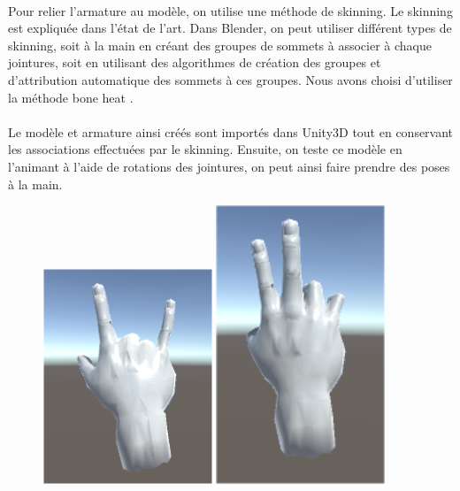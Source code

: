 \paragraph{}
Pour relier l'armature au modèle, on utilise une méthode de skinning. Le skinning est expliquée dans l'état de l'art. Dans Blender, on peut utiliser différent types de skinning, soit \og à la main \fg en créant des groupes de sommets à associer à chaque jointures, soit en utilisant des algorithmes de création des groupes et d'attribution automatique des sommets à ces groupes. Nous avons choisi d'utiliser la méthode \og bone heat \fg. \cite{baran2007automatic}

\paragraph{}
Le modèle et armature ainsi créés sont importés dans Unity3D tout en conservant les associations effectuées par le skinning. Ensuite, on teste ce modèle en l'animant à l'aide de rotations des jointures, on peut ainsi faire prendre des poses à la main. 

\begin{figure}[!h]
	\centering
	\includegraphics[width=0.45\textwidth]{images/HandPose1.png}
	\includegraphics[width=0.45\textwidth]{images/HandPose2.png}
\end{figure}

